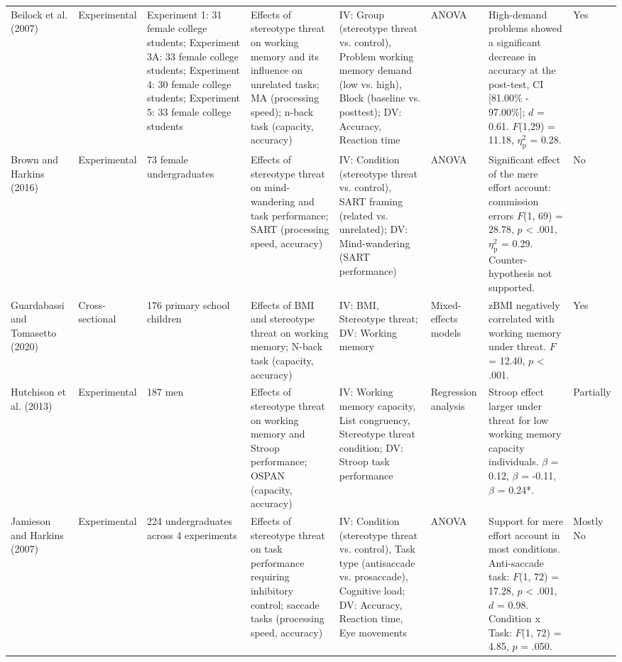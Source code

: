 \documentclass[
  stu, a4paper, 12pt,mask,floatsintext]{apa7}
\newenvironment{lltable}{\begin{landscape}\centering\begin{ThreePartTable}}{\end{ThreePartTable}\end{landscape}}
\begin{document}
\begin{lltable}
\begin{longtable}{p{1.8cm}p{2.6cm}p{2.5cm}p{3cm}p{3cm}p{3cm}p{3.5cm}p{1.5cm}}
Beilock et al. (2007) & Experimental & Experiment 1: 31 female college students; Experiment 3A: 33 female college students; Experiment 4: 30 female college students; Experiment 5: 33 female college students & Effects of stereotype threat on working memory and its influence on unrelated tasks; MA (processing speed); n-back task (capacity, accuracy) & IV: Group (stereotype threat vs. control), Problem working memory demand (low vs. high), Block (baseline vs. posttest); DV: Accuracy, Reaction time & ANOVA & High-demand problems showed a significant decrease in accuracy at the post-test, CI [81.00\% - 97.00\%]; $\textit{d}$ = 0.61. $\textit{F}$(1,29) = 11.18, $\eta^{2}_\text{p}$ = 0.28. & Yes\\
Brown and Harkins (2016) & Experimental & 73 female undergraduates & Effects of stereotype threat on mind-wandering and task performance; SART (processing speed, accuracy) & IV: Condition (stereotype threat vs. control), SART framing (related vs. unrelated); DV: Mind-wandering (SART performance) & ANOVA & Significant effect of the mere effort account: commission errors $\textit{F}$(1, 69) = 28.78, $p$ < .001, $\eta^{2}_\text{p}$ = 0.29. Counter-hypothesis not supported. & No\\
Guardabassi and Tomasetto (2020) & Cross-sectional & 176 primary school children & Effects of BMI and stereotype threat on working memory; N-back task (capacity, accuracy) & IV: BMI, Stereotype threat; DV: Working memory & Mixed-effects models & zBMI negatively correlated with working memory under threat. $F$ = 12.40, $p$ < .001. & Yes\\
Hutchison et al. (2013) & Experimental & 187 men & Effects of stereotype threat on working memory and Stroop performance; OSPAN (capacity, accuracy) & IV: Working memory capacity, List congruency, Stereotype threat condition; DV: Stroop task performance & Regression analysis & Stroop effect larger under threat for low working memory capacity individuals. $\beta$ = 0.12, $\beta$ = -0.11, $\beta$ = 0.24*. & Partially\\
Jamieson and Harkins (2007) & Experimental & 224 undergraduates across 4 experiments & Effects of stereotype threat on task performance requiring inhibitory control; saccade tasks (processing speed, accuracy) & IV: Condition (stereotype threat vs. control), Task type (antisaccade vs. prosaccade), Cognitive load; DV: Accuracy, Reaction time, Eye movements & ANOVA & Support for mere effort account in most conditions. Anti-saccade task: $F$(1, 72) = 17.28, $p$ < .001, $d$ = 0.98. Condition x Task: $F$(1, 72) = 4.85, $p$ = .050. & Mostly No\\

\end{longtable}
\end{lltable}
\end{document}
